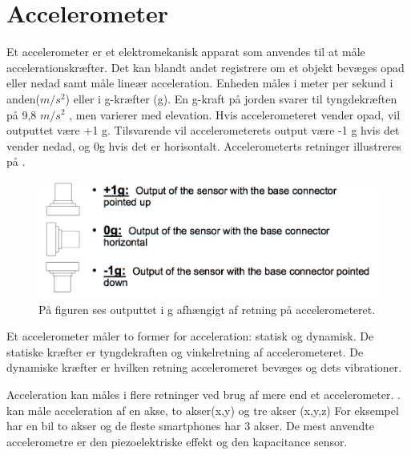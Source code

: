 \section{Accelerometer} 
Et accelerometer er et elektromekanisk apparat som anvendes til at måle accelerationskræfter. Det kan blandt andet registrere om et objekt bevæges opad eller nedad samt måle lineær acceleration\citep{Goodrich2013}. Enheden måles i meter per sekund i anden($m/s^2$) eller i g-kræfter (g). En g-kraft på jorden svarer til tyngdekræften på 9,8 $m/s^2$ , men varierer med elevation. \citep{Sparkfun}
Hvis accelerometeret vender opad, vil outputtet være +1 g. Tilsvarende vil accelerometerets output være -1 g hvis det vender nedad, og 0g hvis det er horisontalt. Accelerometerts retninger illustreres på . \citep{Instruments}

\begin{figure}[H]
	\centering
	\includegraphics[scale=0.25]{figures/bProblemloesning/g.png}
	\caption{På figuren ses outputtet i g afhængigt af retning på accelerometeret. \citep{Instruments}}
	\label{fig:g}
\end{figure}

Et accelerometer måler to former for acceleration: statisk og dynamisk. De statiske kræfter er tyngdekraften og  vinkelretning af accelerometeret. De dynamiske kræfter er hvilken retning acceleromeret bevæges og dets vibrationer. \citep{Sparkfun,Engineering, Goodrich2013}

 

 Acceleration kan måles i flere retninger ved brug af mere end et accelerometer. \citep{Sparkfun}. kan måle acceleration af en akse, to akser(x,y) og tre akser (x,y,z) For eksempel har en bil to akser og de fleste smartphones har 3 akser. \citep{Sparkfun}
 De mest anvendte accelerometre er den piezoelektriske effekt og den kapacitance sensor. 

